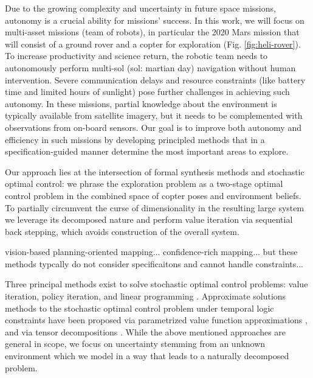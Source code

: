\documentclass[conference]{IEEEtran}
\begin{document}
Due to the growing complexity and uncertainty in future space missions, autonomy is a crucial ability for missions' success. In this work, we will focus on multi-asset missions (team of robots), in particular the 2020 Mars mission that will consist of a ground rover and a copter for exploration (Fig. \ref{fig:heli-rover}). To increase productivity and science return, the robotic team needs to autonomously perform multi-sol (sol: martian day) navigation without human intervention. Severe communication delays and resource constraints (like battery time and limited hours of sunlight) pose further challenges in achieving such autonomy. In these missions, partial knowledge about the environment is typically available from satellite imagery, but it needs to be complemented with observations from on-board sensors. Our goal is to improve both autonomy and efficiency in such missions by developing principled methods that in a specification-guided manner determine the most important areas to explore. 

Our approach lies at the intersection of formal synthesis methods and stochastic optimal control: we phrase the exploration problem as a two-stage optimal control problem in the combined space of copter poses and environment beliefs.
To partially circumvent the curse of dimensionality in the resulting large system we leverage its decomposed nature and perform value iteration via sequential back stepping, which avoids construction of the overall system.


vision-based planning-oriented mapping...
confidence-rich mapping...
but these methods typcally do not consider specificaitons and cannot handle constraints...

Three principal methods exist to solve stochastic optimal control problems: value iteration, policy iteration, and linear programming \cite{Bertsekas1978}. Approximate solutions methods to the stochastic optimal control problem under temporal logic constraints have been proposed via parametrized value function approximations \cite{Papusha2016,Leong2016}, and via tensor decompositions \cite{Alora2016}. While the above mentioned approaches are general in scope, we focus on uncertainty stemming from an unknown environment which we model in a way that leads to a naturally decomposed problem. 

\end{document}
